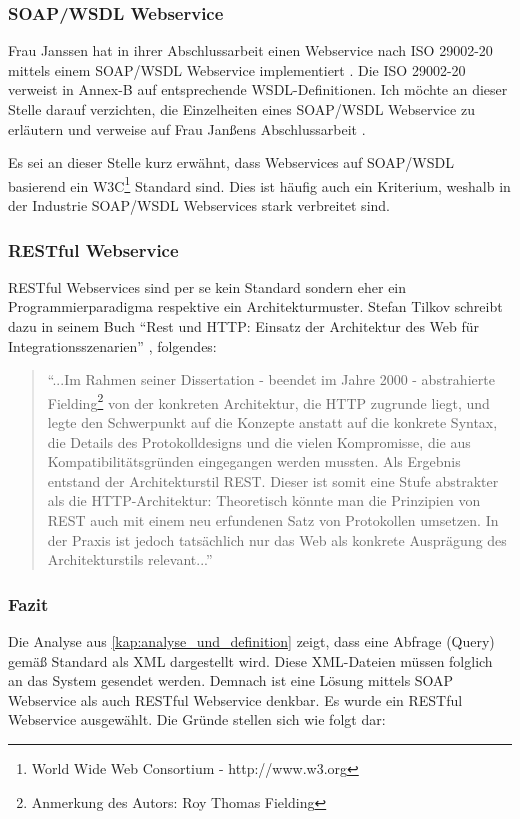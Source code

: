 \subsubsection{SOAP/WSDL Webservice}
Frau Janssen hat in ihrer Abschlussarbeit einen Webservice nach ISO 29002-20 mittels einem SOAP/WSDL Webservice implementiert \citep[vgl.][]{janssen}. Die ISO 29002-20 verweist in Annex-B auf entsprechende WSDL-Definitionen. 
Ich möchte an dieser Stelle darauf verzichten, die Einzelheiten eines SOAP/WSDL Webservice zu erläutern und verweise auf Frau Janßens Abschlussarbeit \citep[vgl.][Kap. 3]{janssen}. 

Es sei an dieser Stelle kurz erwähnt, dass Webservices auf SOAP/WSDL basierend ein W3C\footnote{World Wide Web Consortium - http://www.w3.org} Standard sind. Dies ist häufig auch ein Kriterium, weshalb in der Industrie \gls{SOAP}/WSDL \glspl{Webservice} stark verbreitet sind. 

\subsubsection{RESTful Webservice}  
\gls{REST}ful Webservices sind per se kein Standard sondern eher ein Programmierparadigma respektive ein Architekturmuster. 
Stefan Tilkov schreibt dazu in seinem Buch \enquote{Rest und HTTP: Einsatz der Architektur des Web für Integrationsszenarien} \citep[S.10][]{tilkovrest}, folgendes:

\begin{quotation}
\enquote{...Im Rahmen seiner Dissertation - beendet im Jahre 2000 - abstrahierte Fielding\footnote{Anmerkung des Autors: Roy Thomas Fielding} von der konkreten Architektur, die HTTP zugrunde liegt, und legte den Schwerpunkt auf die Konzepte anstatt auf die konkrete Syntax, die Details des Protokolldesigns und die vielen Kompromisse, die aus Kompatibilitätsgründen eingegangen werden mussten. Als Ergebnis entstand der Architekturstil REST. Dieser ist somit eine Stufe abstrakter als die HTTP-Architektur: Theoretisch könnte man die Prinzipien von REST auch mit einem neu erfundenen Satz von Protokollen umsetzen. In der Praxis ist jedoch tatsächlich nur das Web als konkrete Ausprägung des Architekturstils relevant...}
\end{quotation}
\citep[Vgl. auch][]{fieldingrest}

\subsubsection{Fazit}
Die Analyse aus \autoref{kap:analyse_und_definition} zeigt, dass eine Abfrage (Query) gemäß Standard als XML dargestellt wird. Diese XML-Dateien müssen folglich an das System gesendet werden. Demnach ist eine Lösung mittels \gls{SOAP} \gls{Webservice} als auch \gls{REST}ful \gls{Webservice} denkbar. 
Es wurde ein \gls{REST}ful \gls{Webservice} ausgewählt. Die Gründe stellen sich wie folgt dar:

